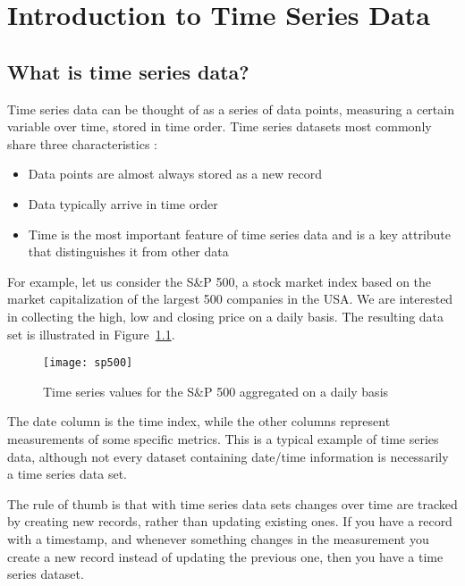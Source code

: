 


\chapter{Introduction to Time Series Data}

\section{What is time series data?}
Time series data can be thought of as a series of data points, measuring a certain variable
over time, stored in time order. Time series datasets most commonly share three
characteristics \cite{AjayKulkarni2018What} :
\begin{itemize}
    \item Data points are almost always stored as a new record
    \item Data typically arrive in time order
    \item Time is the most important feature of time series data and is a key attribute that distinguishes it from other data
\end{itemize}

For example, let us consider the S\&P 500, a stock market index based on the market
capitalization of the largest 500 companies in the USA. We are interested in collecting the high, low and
closing price on a daily basis. The resulting data set is illustrated in Figure~\ref{sp500}.

\begin{figure}
\begin{center}
\texttt{[image: sp500]}
\caption[sp500]{Time series values for the S\&P 500 aggregated on a daily basis}
\label{sp500}
\end{center}
\end{figure}

The date column is the time index, while the other columns represent measurements of some
specific metrics. This is a typical example of time series data, although not every dataset
containing date/time information is necessarily a time series data set.

The rule of thumb is that with time series data sets changes over time are tracked by creating
new records, rather than updating existing ones. If you have a record with a timestamp, and
whenever something changes in the measurement you create a new record instead of updating the
previous one, then you have a time series dataset.


